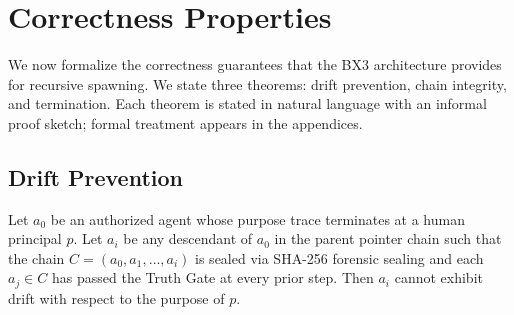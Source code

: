 \section{Correctness Properties}

We now formalize the correctness guarantees that the BX3 architecture provides for recursive spawning. We state three theorems: drift prevention, chain integrity, and termination. Each theorem is stated in natural language with an informal proof sketch; formal treatment appears in the appendices.

\subsection{Drift Prevention}

\begin{theorem}\label{th:drift_prevention}
Let $a_0$ be an authorized agent whose purpose trace terminates at a human principal $p$. Let $a_i$ be any descendant of $a_0$ in the parent pointer chain such that the chain $C = (a_0, a_1, \dots, a_i)$ is sealed via SHA-256 forensic sealing and each $a_j \in C$ has passed the Truth Gate at every prior step. Then $a_i$ cannot exhibit drift with respect to the purpose of $p$.
\end{theorem}

